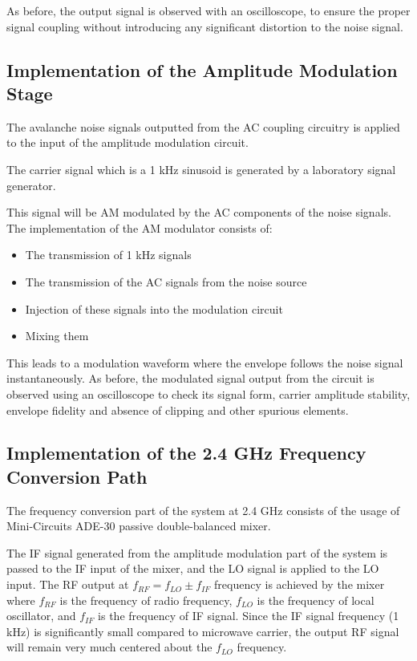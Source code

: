 \documentclass[12pt,a4paper]{report}
\begin{document}
	As before, the output signal is observed with an oscilloscope, to ensure the proper signal coupling without introducing any significant distortion to the noise signal.
	
	\subsection{Implementation of the Amplitude Modulation Stage}
	The avalanche noise signals outputted from the AC coupling circuitry is applied to the input of the amplitude modulation circuit.
	
	The carrier signal which is a 1 kHz sinusoid is generated by a laboratory signal generator.
	
	This signal will be AM modulated by the AC components of the noise signals. The implementation of the AM modulator consists of:
	\begin{itemize}
		\item The transmission of 1 kHz signals
		\item The transmission of the AC signals from the noise source
		\item Injection of these signals into the modulation circuit
		\item Mixing them
	\end{itemize}
	
	This leads to a modulation waveform where the envelope follows the noise signal instantaneously. As before, the modulated signal output from the circuit is observed using an oscilloscope to check its signal form, carrier amplitude stability, envelope fidelity and absence of clipping and other spurious elements.
	\subsection{Implementation of the 2.4 GHz Frequency Conversion Path}
	The frequency conversion part of the system at 2.4 GHz consists of the usage of Mini-Circuits ADE-30 passive double-balanced mixer.
	
	The IF signal generated from the amplitude modulation part of the system is passed to the IF input of the mixer, and the LO signal is applied to the LO input. The RF output at $f_{RF} = f_{LO} \pm f_{IF}$ frequency is achieved by the mixer where $f_{RF}$ is the frequency of radio frequency, $f_{LO}$ is the frequency of local oscillator, and $f_{IF}$ is the frequency of IF signal. Since the IF signal frequency (1 kHz) is significantly small compared to microwave carrier, the output RF signal will remain very much centered about the $f_{LO}$ frequency.
	
\end{document}
